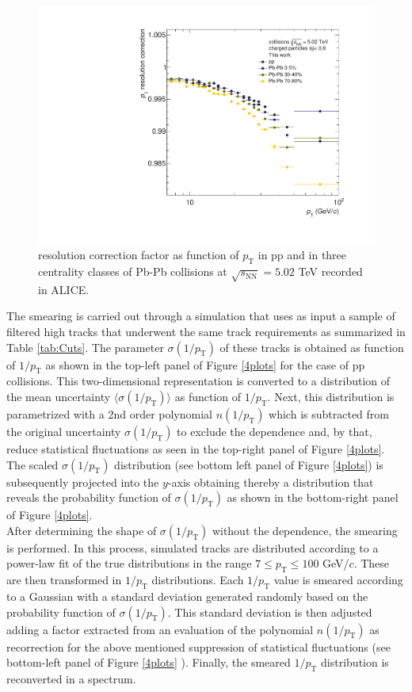 \documentclass[12pt,a4paper]{report}
\begin{document}
\begin{figure}[htb!]
\centering
\includegraphics[width=12cm]{Plots/ptrescorrppPbPb.pdf}  
\caption{\pt resolution correction factor as function of $p_{\mathrm{T}}$ in pp and in three centrality classes of Pb-Pb collisions at $\sqrt{s_\text{NN}} = 5.02$ TeV recorded in ALICE.}
\label{ptrescorrppPbPb}
\end{figure}
The smearing is carried out through a simulation that uses as input a sample of filtered high \pt tracks that underwent the same track requirements as summarized in Table \ref{tab:Cuts}. The parameter $\sigma(1/p_\text{T})$ of these tracks is obtained as function of $1/p_\text{T}$ as shown in the top-left panel of Figure \ref{4plots} for the case of pp collisions. This two-dimensional representation is converted to a distribution of the mean uncertainty $\langle\sigma(1/p_\text{T})\rangle$ as function of $1/p_\text{T}$. Next, this distribution is parametrized with a 2nd order polynomial $n(1/p_\text{T})$ which is subtracted from the original uncertainty $\sigma(1/p_\text{T})$ to exclude the \pt dependence and, by that, reduce statistical fluctuations as seen in the top-right panel of Figure \ref{4plots}. The scaled $\sigma(1/p_\text{T})$ distribution (see bottom left panel of Figure \ref{4plots}) is subsequently projected into the $y$-axis obtaining thereby a distribution that reveals the probability function of $\sigma(1/p_\text{T})$ as shown in the bottom-right panel of Figure \ref{4plots}.\\
After determining the shape of $\sigma(1/p_\text{T})$ without the \pt dependence, the smearing is performed. In this process, simulated tracks are distributed according to a power-law fit of the true \pt distributions in the range $7 \leq p_\text{T} \leq 100$ GeV/$c$. These are then transformed in $1/p_\text{T}$ distributions. Each $1/p_\text{T}$ value is smeared according to a Gaussian with a standard deviation generated randomly based on the probability function of $\sigma(1/p_\text{T})$. This standard deviation is then adjusted adding a factor extracted from an evaluation of the polynomial $n(1/p_\text{T})$ as recorrection for the above mentioned suppression of statistical fluctuations (see bottom-left panel of Figure \ref{4plots} ). Finally, the smeared $1/p_\text{T}$ distribution is reconverted in a \pt spectrum.\\
\end{document}
